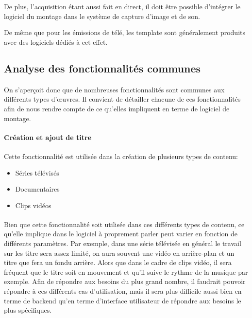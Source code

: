 De plus, l'acquisition étant aussi fait en direct, il doit être possible
d'intégrer le logiciel du montage dans le système de capture d'image et de son.

De même que pour les émissions de télé, les template sont généralement produits avec des logiciels
dédiés à cet effet.

\subsection{Analyse des fonctionnalités communes}

\paragraph{}

On s'aperçoit donc que de nombreuses fonctionnalités sont communes aux différents
types d'œuvres. Il convient de détailler chacune de ces fonctionnalités afin de
nous rendre compte de ce qu'elles impliquent en terme de logiciel de montage.

\paragraph{Création et ajout de titre}

\paragraph{}

Cette fonctionnalité est utilisée dans la création de plusieurs types de contenu:
\begin{itemize} \setlength{\itemsep}{2mm}
  \item {Séries télévisés}
  \item {Documentaires}
  \item {Clips vidéos}
\end{itemize}

\paragraph{}

Bien que cette fonctionnalité soit utilisée dans ces différents types de contenu,
ce qu'elle implique dans le logiciel à proprement parler peut varier en fonction
de différents paramètres. Par exemple, dans une série télévisée en général le
travail sur les titre sera assez limité, on aura souvent une vidéo en arrière-plan
et un titre que fera un fondu arrière. Alors que dans le cadre de clips vidéo,
il sera fréquent que le titre soit en mouvement et qu'il suive le rythme de la
musique par exemple. Afin de répondre aux besoins du plus grand nombre, il faudrait
pouvoir répondre à ces différents cas d'utilisation, mais il sera plus difficile
aussi bien en terme de backend qu'en terme d'interface utilisateur de répondre
aux besoins le plus spécifiques.

